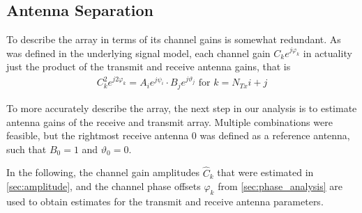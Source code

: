 \subsection{Antenna Separation}
To describe the array in terms of its channel gains is somewhat redundant.
As was defined in the underlying signal model, each channel gain $C_ke^{j\varphi_k}$ in actuality
just the product of the transmit and receive antenna gains, that is
\begin{align}
    C_k^2e^{j2\varphi_k} = A_i e^{j\psi_i} \cdot B_j e^{j\vartheta_j} \text{ for } k=N_{Tx}i+j
\end{align}

To more accurately describe the array,
the next step in our analysis is to estimate antenna gains of the receive and transmit array.
Multiple combinations were feasible, but the rightmost receive antenna 0 was defined as a reference antenna,
such that $B_0=1$ and $\vartheta_0 = 0$.

In the following, the channel gain amplitudes $\hat C_k$ that were estimated in \autoref{sec:amplitude},
and the channel phase offsets $\hat \varphi_k$ from \autoref{sec:phase_analysis}
are used to obtain estimates for the transmit and receive antenna parameters. \\

